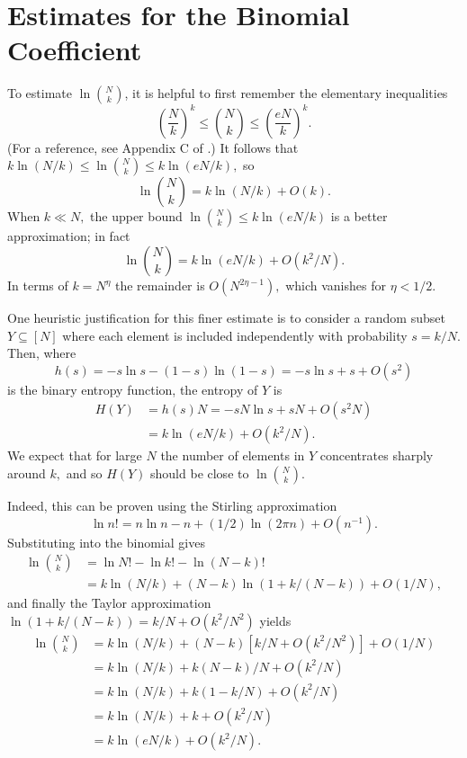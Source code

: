 \section{Estimates for the Binomial Coefficient \label{appendix:binomial}}
To estimate \(\ln \binom{N}{k}\), it is helpful to first remember the elementary inequalities
\[
	\left(\frac{N}{k}\right)^k \le \binom{N}{k} \le \left( \frac{e N}{k} \right)^k.
\]
(For a reference, see Appendix C of \cite{cormen_introduction_2009}.) It follows that $k \ln (N/k) \le \ln \binom{N}{k} \le k \ln (eN/k),$
so
$$
\ln \binom{N}{k} = k \ln (N/k) + O(k).
$$
When $k \ll N,$ the upper bound $\ln \binom N k \le k \ln (e N/k)$ is a better approximation; in fact
$$
\ln \binom N k = k \ln (e N/k) + O(k^2 / N).
$$
In terms of $k = N^\eta$ the remainder is $O(N^{2 \eta - 1}),$ which vanishes for $\eta < 1/2.$

One heuristic justification for this finer estimate is to consider a random subset \(Y \subseteq [N]\) where each element is included independently with probability \(s = k/N\). Then, where
$$
h(s) = - s \ln s - (1 - s) \ln (1 - s) = - s \ln s + s + O(s^2)
$$
is the binary entropy function, the entropy of \(Y\) is
\begin{align*}
	H(Y) & = h(s) N = - s N \ln s + s N + O(s^2 N) \\
	     & = k \ln (eN/k) + O(k^2/N).
\end{align*}
We expect that for large $N$ the number of elements in $Y$ concentrates sharply around $k,$ and so $H(Y)$ should be close to $\ln \binom N k.$

Indeed, this can be proven using the Stirling approximation
$$
\ln n! = n \ln n - n + (1/2) \ln(2\pi n) + O(n^{-1}).
$$
Substituting into the binomial gives
\begin{align*}
\ln \binom{N}{k} &= \ln N! - \ln k! - \ln(N-k)! \\
&= k \ln (N/k) + (N-k) \ln (1 + k/(N-k)) + O(1/N),
\end{align*}
and finally the Taylor approximation $\ln(1 + k/(N-k)) = k/N + O(k^2/N^2)$ yields
\begin{align*}
\ln \binom{N}{k} &= k \ln (N/k) + (N-k) [k/N + O(k^2/N^2)] + O(1/N) \\
&= k \ln (N/k) + k(N-k)/N + O(k^2/N) \\
&= k \ln (N/k) + k(1 - k/N) + O(k^2/N) \\
&= k \ln (N/k) + k + O(k^2/N) \\
&= k \ln (eN/k) + O(k^2/N).
\end{align*}
